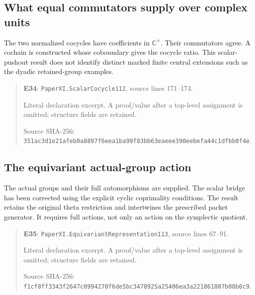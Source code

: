 \documentclass[10pt,oneside]{book}
\begin{document}
\subsection{What equal commutators supply over complex units}
\label{guide:E34}
The two normalized cocycles have coefficients in \(\mathbb C^\times\). Their commutators agree.
A cochain is constructed whose coboundary gives the cocycle ratio. This scalar-pushout result does not identify distinct marked finite central extensions such as the dyadic retained-group examples.

\begin{quote}\footnotesize\textbf{E34}: \nolinkurl{PaperXI.ScalarCocycle112}, source lines 171--174.\par Literal declaration excerpt. A proof/value after a top-level assignment is omitted; structure fields are retained.\par Source SHA-256: {\scriptsize\texttt{351ac3d1e21afeb0a8897f6eea1ba99f83bb63eaeee390eebefa44c1dfbb0f4e}}.\end{quote}


\subsection{The equivariant actual-group action}
\label{guide:E35}
The actual groups and their full automorphisms are supplied. The scalar bridge has been corrected using the explicit cyclic coprimality conditions.
The result retains the original theta restriction and intertwines the prescribed packet generator. It requires full actions, not only an action on the symplectic quotient.

\begin{quote}\footnotesize\textbf{E35}: \nolinkurl{PaperXI.EquivariantRepresentation113}, source lines 67--91.\par Literal declaration excerpt. A proof/value after a top-level assignment is omitted; structure fields are retained.\par Source SHA-256: {\scriptsize\texttt{f1cf8ff3343f2647c0994270f6de5bc3478925a25406ea3a221861807b08b6c9}}.\end{quote}

\end{document}
